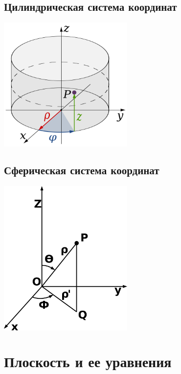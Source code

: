 \documentclass[12pt, fleqn]{extarticle}
\begin{document}
\subsection*{Цилиндрическая система координат}

\begin{center}
    \includegraphics[width=0.5\textwidth]{cylindrical_system}
\end{center}

\subsection*{Сферическая система координат}

\begin{center}
    \includegraphics[width=0.5\textwidth]{spherical_system}
\end{center}

\newpage

\section{Плоскость и ее уравнения}\label{sec:plane}
\end{document}
